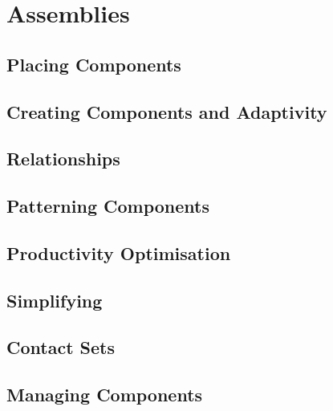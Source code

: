 \chapter{Assemblies}

\section{Placing Components}

\section{Creating Components and Adaptivity}

\section{Relationships}

\section{Patterning Components}

\section{Productivity Optimisation}

\section{Simplifying}

\section{Contact Sets}

\section{Managing Components}